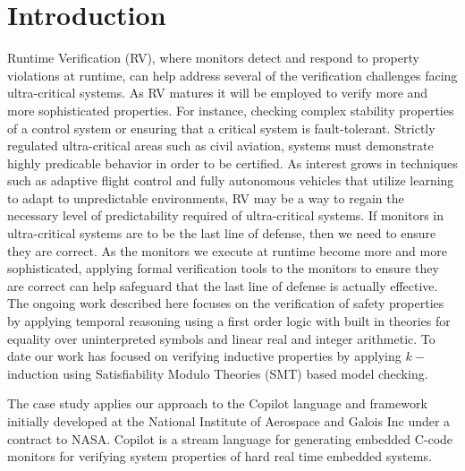 \section{Introduction}\label{sec:intro}
Runtime Verification (RV), where monitors detect and respond to
property violations at runtime, can help address several of the
verification challenges facing ultra-critical systems.  As RV matures
it will be employed to verify more and more sophisticated
properties. For instance, checking complex stability properties of a
control system or ensuring that a critical system is fault-tolerant.
Strictly regulated ultra-critical areas such as civil aviation,
systems must demonstrate highly predicable behavior in order to be
certified. As interest grows in techniques such as adaptive flight
control and fully autonomous vehicles that utilize learning to adapt
to unpredictable environments, RV may be a way to regain the necessary
level of predictability required of ultra-critical systems.  If
monitors in ultra-critical systems are to be the last line of defense,
then we need to ensure they are correct.  As the monitors we execute
at runtime become more and more sophisticated, applying formal
verification tools to the monitors to ensure they are correct can help
safeguard that the last line of defense is actually effective. The
ongoing work described here focuses on the verification of safety
properties by applying temporal reasoning using a first order logic
with built in theories for equality over uninterpreted symbols and
linear real and integer arithmetic. To date our work has focused on
verifying inductive properties by applying $k-$induction using
Satisfiability Modulo Theories (SMT) based model checking.

  The case study applies our approach to the Copilot language and
  framework initially developed at the National Institute of Aerospace
  and Galois Inc under a contract to NASA.  Copilot is a stream
  language for generating embedded C-code monitors for verifying
  system properties of hard real time embedded systems. 



  







